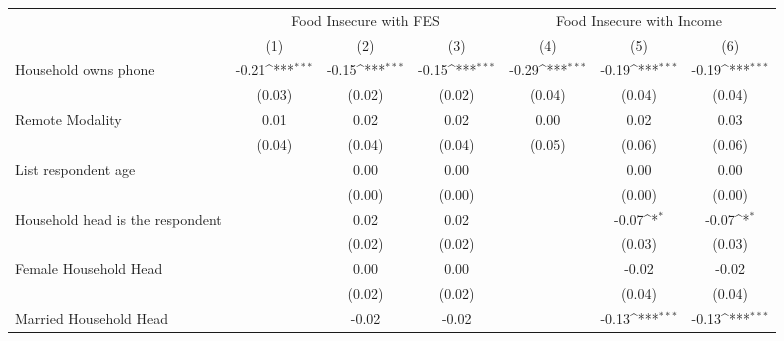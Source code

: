 {
\def\sym#1{\ifmmode^{#1}\else\(^{#1}\)\fi}
\begin{tabular}{l*{6}{c}}
\hline\hline
                    &\multicolumn{3}{c}{Food Insecure with FES}                       &\multicolumn{3}{c}{Food Insecure with Income}                    \\\cmidrule(lr){2-4}\cmidrule(lr){5-7}
                    &\multicolumn{1}{c}{(1)}         &\multicolumn{1}{c}{(2)}         &\multicolumn{1}{c}{(3)}         &\multicolumn{1}{c}{(4)}         &\multicolumn{1}{c}{(5)}         &\multicolumn{1}{c}{(6)}         \\
\hline
Household owns phone&       -0.21\sym{***}&       -0.15\sym{***}&       -0.15\sym{***}&       -0.29\sym{***}&       -0.19\sym{***}&       -0.19\sym{***}\\
                    &      (0.03)         &      (0.02)         &      (0.02)         &      (0.04)         &      (0.04)         &      (0.04)         \\
Remote Modality     &        0.01         &        0.02         &        0.02         &        0.00         &        0.02         &        0.03         \\
                    &      (0.04)         &      (0.04)         &      (0.04)         &      (0.05)         &      (0.06)         &      (0.06)         \\
List respondent age &                     &        0.00         &        0.00         &                     &        0.00         &        0.00         \\
                    &                     &      (0.00)         &      (0.00)         &                     &      (0.00)         &      (0.00)         \\
Household head is the respondent&                     &        0.02         &        0.02         &                     &       -0.07\sym{*}  &       -0.07\sym{*}  \\
                    &                     &      (0.02)         &      (0.02)         &                     &      (0.03)         &      (0.03)         \\
Female Household Head&                     &        0.00         &        0.00         &                     &       -0.02         &       -0.02         \\
                    &                     &      (0.02)         &      (0.02)         &                     &      (0.04)         &      (0.04)         \\
Married Household Head&                     &       -0.02         &       -0.02         &                     &       -0.13\sym{***}&       -0.13\sym{***}\\

\end{tabular}}
